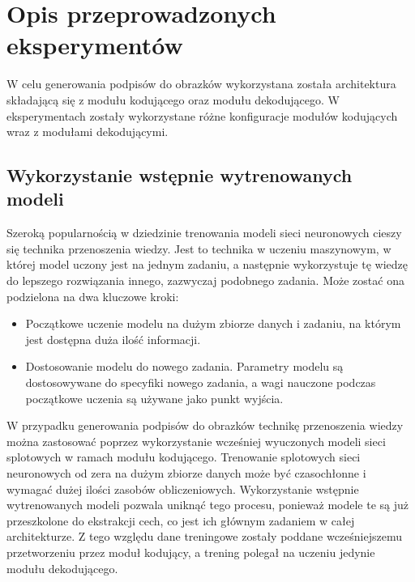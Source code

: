 \newpage %

\section{Opis przeprowadzonych eksperymentów}
W celu generowania podpisów do obrazków wykorzystana została architektura składającą się z modułu kodującego oraz modułu dekodującego. W eksperymentach zostały wykorzystane różne konfiguracje modułów kodujących wraz z modułami dekodującymi.
\subsection{Wykorzystanie wstępnie wytrenowanych modeli}
Szeroką popularnością w dziedzinie trenowania modeli sieci neuronowych cieszy się technika przenoszenia wiedzy. Jest to technika w uczeniu maszynowym, w której model uczony jest na jednym zadaniu, a następnie wykorzystuje tę wiedzę do lepszego rozwiązania innego, zazwyczaj podobnego zadania. Może zostać ona podzielona na dwa kluczowe kroki:
\begin{itemize}
    \item Początkowe uczenie modelu na dużym zbiorze danych i zadaniu, na którym jest dostępna duża ilość informacji.
    \item  Dostosowanie modelu do nowego zadania. Parametry modelu są dostosowywane do specyfiki nowego zadania, a wagi nauczone podczas początkowe uczenia są używane jako punkt wyjścia.
\end{itemize}
W przypadku generowania podpisów do obrazków technikę przenoszenia wiedzy można zastosować poprzez wykorzystanie wcześniej wyuczonych modeli sieci splotowych w ramach modułu kodującego. Trenowanie splotowych sieci neuronowych od zera na dużym zbiorze danych może być czasochłonne i wymagać dużej ilości zasobów obliczeniowych. Wykorzystanie wstępnie wytrenowanych modeli pozwala uniknąć tego procesu, ponieważ modele te są już przeszkolone do ekstrakcji cech, co jest ich głównym zadaniem w całej architekturze. Z tego względu dane treningowe zostały poddane wcześniejszemu przetworzeniu przez moduł kodujący, a trening polegał na uczeniu jedynie modułu dekodującego.

